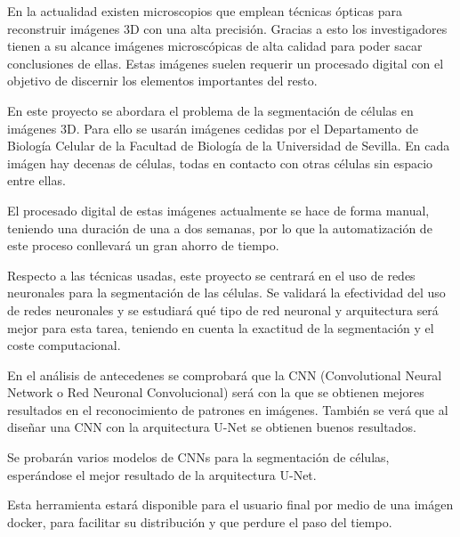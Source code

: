 
En la actualidad existen microscopios que emplean técnicas ópticas para reconstruir imágenes 3D con una alta precisión. Gracias a esto los investigadores tienen a su alcance imágenes microscópicas de alta calidad para poder sacar conclusiones de ellas. Estas imágenes suelen requerir un procesado digital con el objetivo de discernir los elementos importantes del resto.

En este proyecto se abordara el problema de la segmentación de células en imágenes 3D. Para ello se usarán imágenes  cedidas por el Departamento de Biología Celular de la Facultad de Biología de la Universidad de Sevilla. En cada imágen hay decenas de células, todas en contacto con otras células sin espacio entre ellas.

El procesado digital de estas imágenes actualmente se hace de forma manual, teniendo una duración de una a dos semanas, por lo que la automatización de este proceso conllevará un gran ahorro de tiempo.

Respecto a las técnicas usadas, este proyecto se centrará en el uso de redes neuronales para la segmentación de las células. Se validará la efectividad del uso de redes neuronales y se estudiará qué tipo de red neuronal y arquitectura será mejor para esta tarea, teniendo en cuenta la exactitud de la segmentación y el coste computacional.

En el análisis de antecedenes se comprobará que la CNN (Convolutional Neural Network o Red Neuronal Convolucional) será con la que se obtienen mejores resultados en el reconocimiento de patrones en imágenes. También se verá que al diseñar una CNN con la arquitectura U-Net se obtienen buenos resultados.

Se probarán varios modelos de CNNs para la segmentación de células, esperándose el mejor resultado de la arquitectura U-Net.

Esta herramienta estará disponible para el usuario final por medio de una imágen docker, para facilitar su distribución y que perdure el paso del tiempo.
